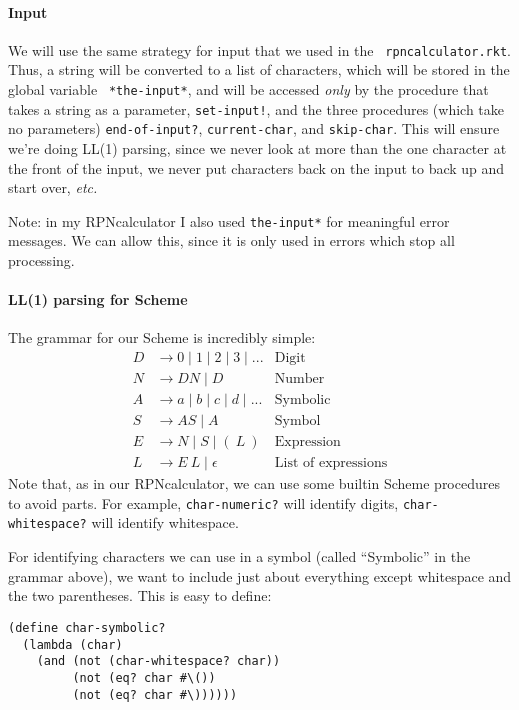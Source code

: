 \documentclass{article}
\begin{document}
\paragraph{Input}
We will use the same strategy for input that we used in the {\tt
  rpncalculator.rkt}.  Thus, a string will be converted to a list of
characters, which will be stored in the global variable {\tt
  *the-input*},
and will be accessed {\em only} by the procedure
that takes a string as a parameter, {\tt set-input!},
and the three procedures (which take no
parameters) {\tt end-of-input?}, {\tt current-char},
and {\tt skip-char}.  This will ensure we're doing LL(1) parsing,
since we never look at more than the one character at the front of the
input, we never put characters back on the input to back up and start
over, {\em etc.}

Note: in my RPNcalculator I also used {\tt *the-input*} for meaningful
error messages.  We can allow this, since it is only used in errors
which stop all processing.

\paragraph{LL(1) parsing for Scheme}

The grammar for our Scheme is incredibly simple:
\begin{align*}
  D &\rightarrow 0 \mid 1 \mid 2 \mid 3 \mid ... &\mbox{Digit}\\
  N &\rightarrow DN \mid D &\mbox{Number}\\
  A &\rightarrow a \mid b \mid c \mid d \mid ... &\mbox{Symbolic}\\
  S &\rightarrow AS \mid A &\mbox{Symbol}\\
  E &\rightarrow N \mid S \mid (\ L\ ) &\mbox{Expression}\\
  L &\rightarrow E\ L \mid \epsilon&\mbox{List of expressions}
\end{align*}
Note that, as in our RPNcalculator,
we can use some builtin Scheme procedures
to avoid parts.  For example, {\tt char-numeric?} will identify
digits,
{\tt char-whitespace?} will identify whitespace.

For identifying characters we can use in a symbol (called
``Symbolic'' in the grammar above), we want to include
just about everything except whitespace and the two parentheses.  This
is easy to define:
\begin{Verbatim}[frame=single]
(define char-symbolic?
  (lambda (char)
    (and (not (char-whitespace? char))
         (not (eq? char #\())
         (not (eq? char #\))))))  
\end{Verbatim}
\end{document}
